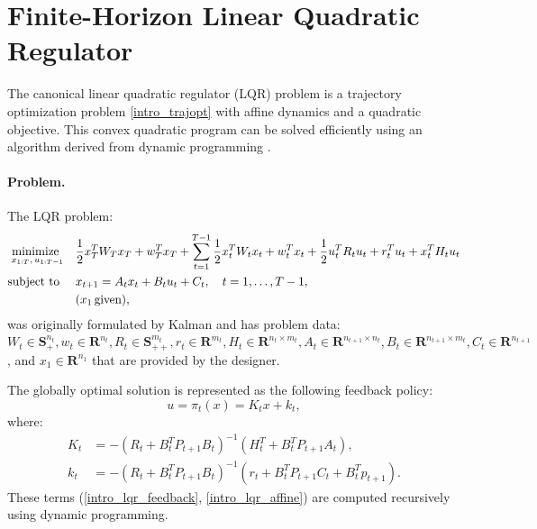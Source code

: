\section{Finite-Horizon Linear Quadratic Regulator}
The canonical linear quadratic regulator (LQR) problem is a trajectory optimization problem \eqref{intro_trajopt} with affine dynamics and a quadratic objective. This convex quadratic program \cite{boyd2004convex} can be solved efficiently using an algorithm derived from dynamic programming \cite{bellman1966dynamic}.

\paragraph{Problem.}
The LQR problem:
\begin{align}
	\label{intro_lqr_problem}
	\underset{x_{1:T}, \phantom{\,} u_{1:T-1}}{\text{minimize }} & \quad  \frac{1}{2} x_T^T W_T x_T + w_T^T x_T + \sum \limits_{t = 1}^{T-1} \frac{1}{2} x_t^T W_t x_t + w_t^T x_t + \frac{1}{2} u_t^T R_t u_t + r_t^T u_t + x_t^T H_t u_t \\
	\text{subject to } & \quad x_{t+1} = A_t x_t + B_t u_t + C_t, \quad t = 1,\dots,T-1, \notag \\
	& \quad (x_1 \, \text{given}), \notag 
\end{align}
was originally formulated by Kalman \cite{kalman1964lqr} and has problem data: $W_t \in \mathbf{S}_{+}^{n_t}, w_t \in \mathbf{R}^{n_t}, R_t \in \mathbf{S}_{++}^{m_t}, r_t \in \mathbf{R}^{m_t}, H_t \in \mathbf{R}^{n_t \times m_t}, A_t \in \mathbf{R}^{n_{t+1} \times n_t}, B_t \in \mathbf{R}^{n_{t+1} \times m_t}, C_t \in \mathbf{R}^{n_{t+1}}$, and $x_1 \in \mathbf{R}^{n_1}$ that are provided by the designer.

The globally optimal solution is represented as the following feedback policy: 
\begin{equation}
	u = \pi_t(x) = K_t x + k_t, \label{intro_lqr_policy}
\end{equation}
where:
\begin{align}
	K_t &= -(R_t + B_t^T P_{t+1} B_t)^{-1} (H_t^T + B_t^T P_{t+1} A_t), \label{intro_lqr_feedback} \\
	k_t &= -(R_t + B_t^T P_{t+1} B_t)^{-1} (r_t + B_t^T P_{t+1} C_t + B_t^T p_{t+1}). \label{intro_lqr_affine}
\end{align}
These terms (\ref{intro_lqr_feedback}, \ref{intro_lqr_affine}) are computed recursively using dynamic programming.


